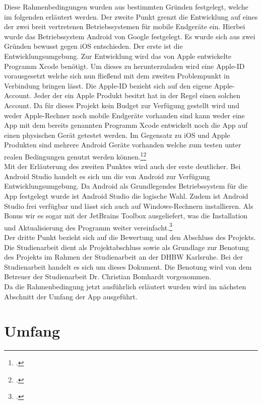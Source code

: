 Diese Rahmenbedingungen wurden aus bestimmten Gründen festgelegt, welche im folgenden erläutert werden.
Der zweite Punkt grenzt die Entwicklung auf eines der zwei breit vertretenen Betriebssystemen für mobile Endgeräte ein. Hierbei wurde das Betriebssystem Android von Google festgelegt. Es wurde sich aus zwei Gründen bewusst gegen iOS entschieden. Der erste ist die Entwicklungsumgebung. Zur Entwicklung wird das von Apple entwickelte Programm Xcode benötigt. Um dieses zu herunterzuladen wird eine Apple-ID vorausgesetzt welche sich nun fließend mit dem zweiten Problempunkt in Verbindung bringen lässt. Die Apple-ID bezieht sich auf den eigene Apple-Account. Jeder der ein Apple Produkt besitzt hat in der Regel einen solchen Account. Da für dieses Projekt kein Budget zur Verfügung gestellt wird und weder Apple-Rechner noch mobile Endgeräte vorhanden sind kann weder eine App mit dem bereits genannten Programm Xcode entwickelt noch die App auf einen physischen Gerät getestet werden. Im Gegensatz zu iOS und Apple Produkten sind mehrere Android Geräte vorhanden welche zum testen unter realen Bedingungen genutzt werden können.\footcite{chipIPhone.2019}\footcite{Xcode.2021} \\
Mit der Erläuterung des zweiten Punktes wird auch der erste deutlicher. Bei Android Studio handelt es sich um die von Android zur Verfügung Entwicklungsumgebung. Da Android als Grundlegendes Betriebssystem für die App festgelegt wurde ist Android Studio die logische Wahl. Zudem ist Android Studio frei verfügbar und lässt sich auch auf Windows-Rechnern installieren. Als Bonus wir es sogar mit der JetBrains Toolbox ausgeliefert, was die Installation und Aktualisierung des Programm weiter vereinfacht.\footcite{AndroidStudio.2021} \\
Der dritte Punkt bezieht sich auf die Bewertung und den Abschluss des Projekts. Die Studienarbeit dient als Projektabschluss sowie als Grundlage zur Benotung des Projekts im Rahmen der Studienarbeit an der \ac{DHBW} Karlsruhe. Bei der Studienarbeit handelt es sich um dieses Dokument. Die Benotung wird von dem Betreuer der Studienarbeit Dr. Christian Bomhardt vorgenommen.\\
Da die Rahmenbedingung jetzt ausführlich erläutert wurden wird im nächsten Abschnitt der Umfang der App ausgeführt.

\section{Umfang}\label{sec:umfang}

